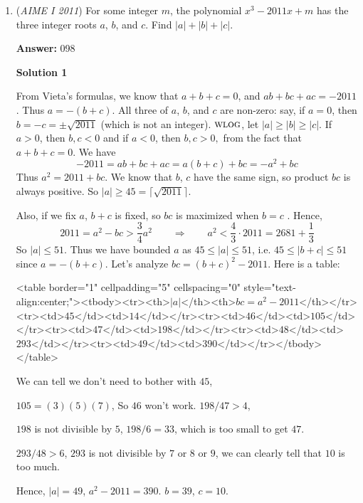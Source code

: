 \begin{enumerate}
 


 \href{https://mathproblemsolvingskills.wordpress.com/}{MathProblemSolvingSkills.com}

 


 


 


	\item (\textit{AIME I 2011}) For some integer $m$, the polynomial $x^3 - 2011x + m$ has the three integer roots $a$, $b$, and $c$.  Find $|a| + |b| + |c|$.


 
 \textbf{Answer: }098



\textbf{Solution 1}

From Vieta's formulas, we know that $a+b+c = 0$, and $ab+bc+ac = -2011$. Thus $a = -(b+c)$. All three of $a$, $b$, and $c$ are non-zero: say, if $a=0$, then $b=-c=\pm\sqrt{2011}$ (which is not an integer). $\textsc{wlog}$, let $|a| \ge |b| \ge |c|$. If $a > 0$, then $b,c < 0$ and if $a < 0$, then $b,c > 0,$ from the fact that $a+b+c=0$. We have 
 \[-2011=ab+bc+ac = a(b+c)+bc = -a^2+bc\]Thus $a^2 = 2011 + bc$. We know that $b$, $c$ have the same sign, so product $bc$ is always positive. So $|a| \ge 45 = \lceil \sqrt{2011} \rceil$. 

 Also, if we fix $a$, $b+c$ is fixed, so $bc$ is maximized when $b = c$ . Hence, 
 \[2011 = a^2 - bc > \frac{3}{4}a^2 \qquad \Longrightarrow \qquad a ^2 < \frac{4}{3}\cdot 2011 = 2681+\frac{1}{3}\]So $|a| \le 51$. Thus we have bounded $a$ as $45\le |a| \le 51$, i.e. $45\le |b+c| \le 51$ since $a=-(b+c)$. Let's analyze $bc=(b+c)^2-2011$. Here is a table: 

 <table border="1" cellpadding="5" cellspacing="0" style="text-align:center;"><tbody><tr><th>$|a|$</th><th>$bc=a^2-2011$</th></tr><tr><td>$45$</td><td>$14$</td></tr><tr><td>$46$</td><td>$105$</td></tr><tr><td>$47$</td><td>$198$</td></tr><tr><td>$48$</td><td>$293$</td></tr><tr><td>$49$</td><td>$390$</td></tr></tbody></table>


 We can tell we don't need to bother with $45$, 

 $105 = (3)(5)(7)$, So $46$ won't work. $198/47 > 4$, 

 $198$ is not divisible by $5$, $198/6 = 33$, which is too small to get $47$.

 $293/48 > 6$, $293$ is not divisible by $7$ or $8$ or $9$, we can clearly tell that $10$ is too much.

 
Hence, $|a| = 49$, $a^2 -2011 = 390$. $b = 39$, $c = 10$.


\end{enumerate}
